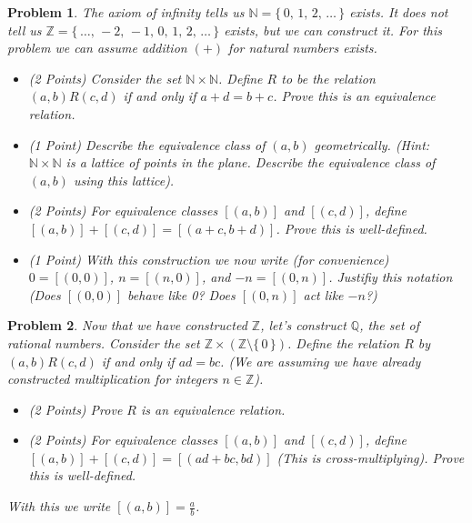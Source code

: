 \documentclass{article}
\theoremstyle{normal}
\newtheorem{problem}{Problem}
\begin{document}
    \begin{problem}
        The axiom of infinity tells us $\mathbb{N}=\{\,0,\,1,\,2,\,\dots\,\}$
        exists. It does not tell us
        $\mathbb{Z}=\{\,\dots,\,-2,\,-1,\,0,\,1,\,2,\,\dots\,\}$ exists, but we
        can construct it. For this problem we can assume addition $(+)$ for
        natural numbers exists.
        \begin{itemize}
            \item (2 Points) Consider the set $\mathbb{N}\times\mathbb{N}$.
                Define $R$ to be the relation $(a,b)R(c,d)$ if and only if
                $a+d=b+c$. Prove this is an equivalence relation.
            \item (1 Point) Describe the equivalence class of $(a,b)$
                geometrically. (Hint: $\mathbb{N}\times\mathbb{N}$ is a lattice
                of points in the plane. Describe the equivalence class of
                $(a,b)$ using this lattice).
            \item (2 Points) For equivalence classes $[(a,b)]$ and $[(c,d)]$,
                define $[(a,b)]+[(c,d)]=[(a+c,b+d)]$. Prove this is
                well-defined.
            \item (1 Point) With this construction we now write
                (for convenience) $0=[(0,0)]$, $n=[(n,0)]$, and $-n=[(0,n)]$.
                Justifiy this notation (Does $[(0,0)]$ behave like 0? Does
                $[(0,n)]$ act like $-n$?)
        \end{itemize}
    \end{problem}
    \begin{problem}
        Now that we have constructed $\mathbb{Z}$, let's construct $\mathbb{Q}$,
        the set of rational numbers. Consider the set
        $\mathbb{Z}\times(\mathbb{Z}\setminus\{\,0\,\})$. Define the relation
        $R$ by $(a,b)R(c,d)$ if and only if $ad=bc$. (We are assuming we have
        already constructed multiplication for integers $n\in\mathbb{Z}$).
        \begin{itemize}
            \item (2 Points) Prove $R$ is an equivalence relation.
            \item (2 Points) For equivalence classes $[(a,b)]$ and $[(c,d)]$,
                define $[(a,b)]+[(c,d)]=[(ad+bc,bd)]$ (This is
                \textit{cross-multiplying}). Prove this is well-defined.
        \end{itemize}
        With this we write $[(a,b)]=\frac{a}{b}$.
    \end{problem}
\end{document}
